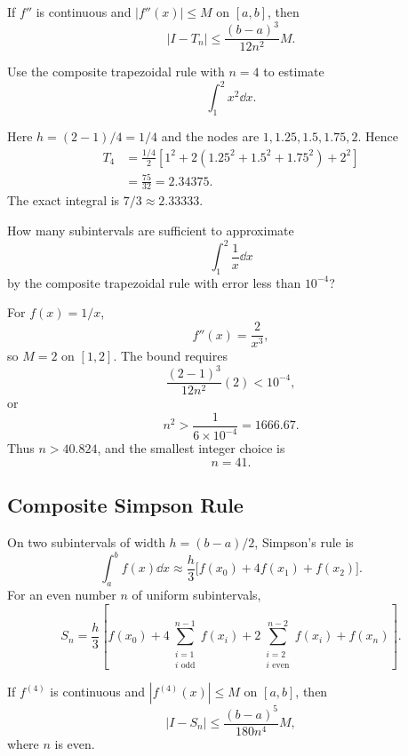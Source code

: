\begin{theorem}
If $f''$ is continuous and $|f''(x)|\le M$ on $[a,b]$, then
\[
 |I-T_n|
 \le\frac{(b-a)^3}{12n^2}M.
\]
\end{theorem}

\begin{example}
Use the composite trapezoidal rule with $n=4$ to estimate
\[
 \int_1^2x^2\dd x.
\]
\end{example}

\begin{solution}[4.0cm]
Here $h=(2-1)/4=1/4$ and the nodes are
$1,1.25,1.5,1.75,2$.  Hence
\[
\begin{aligned}
T_4&=\frac{1/4}{2}
\left[1^2+2(1.25^2+1.5^2+1.75^2)+2^2\right]\\
&=\frac{75}{32}=2.34375.
\end{aligned}
\]
The exact integral is $7/3\approx2.33333$.
\end{solution}

\begin{example}
How many subintervals are sufficient to approximate
\[
 \int_1^2\frac1x\dd x
\]
by the composite trapezoidal rule with error less than $10^{-4}$?
\end{example}

\begin{solution}[3.5cm]
For $f(x)=1/x$,
\[
 f''(x)=\frac2{x^3},
\]
so $M=2$ on $[1,2]$.  The bound requires
\[
 \frac{(2-1)^3}{12n^2}(2)<10^{-4},
\]
or
\[
 n^2>\frac1{6\times10^{-4}}=1666.67.
\]
Thus $n>40.824$, and the smallest integer choice is
\[
 n=41.
\]
\end{solution}

\subsection{Composite Simpson Rule}

On two subintervals of width $h=(b-a)/2$, Simpson's rule is
\[
 \int_a^b f(x)\dd x
 \approx\frac h3\bigl[f(x_0)+4f(x_1)+f(x_2)\bigr].
\]
For an even number $n$ of uniform subintervals,
\[
 S_n=\frac h3\left[
 f(x_0)
 +4\sum_{\substack{i=1\\i\text{ odd}}}^{n-1}f(x_i)
 +2\sum_{\substack{i=2\\i\text{ even}}}^{n-2}f(x_i)
 +f(x_n)
 \right].
\]

\begin{theorem}
If $f^{(4)}$ is continuous and $|f^{(4)}(x)|\le M$ on $[a,b]$, then
\[
 |I-S_n|
 \le\frac{(b-a)^5}{180n^4}M,
\]
where $n$ is even.
\end{theorem}

